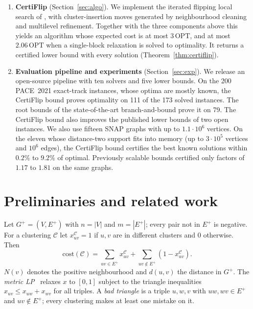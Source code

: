\documentclass[11pt]{article}
\theoremstyle{definition}
\newcommand{\OPT}{\mathrm{OPT}}
\newcommand{\cost}{\mathrm{cost}}
\newcommand{\Ep}{E^{+}}
\begin{document}
\begin{enumerate}
\item \textbf{CertiFlip} (Section~\ref{sec:algo}).  We implement the iterated
flipping local search of \citet{CohenAddadLPTYZ24}, with cluster-insertion
moves generated by neighbourhood cleaning and multilevel refinement.  Together
with the three components above this yields an algorithm whose expected cost
is at most $3\,\OPT$, and at most $2.06\,\OPT$ when a single-block relaxation
is solved to optimality.  It returns a certified lower bound with every
solution (Theorem~\ref{thm:certiflip}).

\item \textbf{Evaluation pipeline and experiments} (Section~\ref{sec:exp}).
We release an open-source pipeline with ten solvers and five lower bounds.
On the 200 PACE~2021 exact-track instances, whose optima are mostly known, the
CertiFlip bound proves optimality on 111 of the 173 solved instances.  The
root bounds of the state-of-the-art branch-and-bound prove it on 79.  The
CertiFlip bound also improves the published lower bounds of two open
instances.  We also use fifteen SNAP graphs with up to $1.1\cdot 10^6$ vertices.  On the
eleven whose distance-two support fits into memory (up to $3\cdot10^5$
vertices and $10^6$ edges), the CertiFlip bound certifies the best known
solutions within $0.2\%$ to $9.2\%$ of optimal.  Previously scalable bounds
certified only factors of $1.17$ to $1.81$ on the same graphs.
\end{enumerate}

\section{Preliminaries and related work}\label{sec:prelim}

Let $G^+=(V,\Ep)$ with $n=|V|$ and $m=|\Ep|$; every pair not in $\Ep$ is
negative.  For a clustering $\mathcal{C}$ let $x^{\mathcal C}_{uv}=1$ if $u,v$
are in different clusters and $0$ otherwise.  Then
\[
\cost(\mathcal C)=\sum_{uv\in\Ep}x^{\mathcal C}_{uv}+\sum_{uv\notin\Ep}(1-x^{\mathcal C}_{uv}).
\]
$N(v)$ denotes the positive neighbourhood and $d(u,v)$ the distance in $G^+$.
The \emph{metric LP}~\citep{CharikarGW05,AilonCN08} relaxes $x$ to $[0,1]$
subject to the triangle inequalities $x_{uv}\le x_{uw}+x_{wv}$ for all
triples.  A \emph{bad triangle} is a triple $u,w,v$ with $uw,wv\in\Ep$ and
$uv\notin\Ep$; every clustering makes at least one mistake on it.
\end{document}
